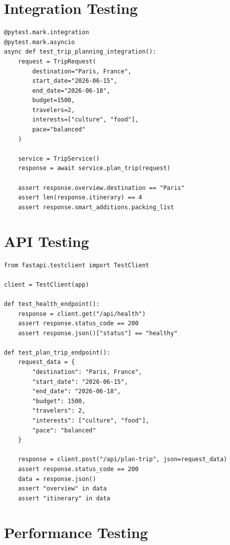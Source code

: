 \documentclass[12pt,a4paper]{report}
\begin{document}
\section{Integration Testing}

\begin{lstlisting}[style=pythonstyle, caption={Integration Test Example}]
@pytest.mark.integration
@pytest.mark.asyncio
async def test_trip_planning_integration():
    request = TripRequest(
        destination="Paris, France",
        start_date="2026-06-15",
        end_date="2026-06-18",
        budget=1500,
        travelers=2,
        interests=["culture", "food"],
        pace="balanced"
    )
    
    service = TripService()
    response = await service.plan_trip(request)
    
    assert response.overview.destination == "Paris"
    assert len(response.itinerary) == 4
    assert response.smart_additions.packing_list
\end{lstlisting}

\section{API Testing}

\begin{lstlisting}[style=pythonstyle, caption={API Test Example}]
from fastapi.testclient import TestClient

client = TestClient(app)

def test_health_endpoint():
    response = client.get("/api/health")
    assert response.status_code == 200
    assert response.json()["status"] == "healthy"

def test_plan_trip_endpoint():
    request_data = {
        "destination": "Paris, France",
        "start_date": "2026-06-15",
        "end_date": "2026-06-18",
        "budget": 1500,
        "travelers": 2,
        "interests": ["culture", "food"],
        "pace": "balanced"
    }
    
    response = client.post("/api/plan-trip", json=request_data)
    assert response.status_code == 200
    data = response.json()
    assert "overview" in data
    assert "itinerary" in data
\end{lstlisting}

\section{Performance Testing}
\end{document}
